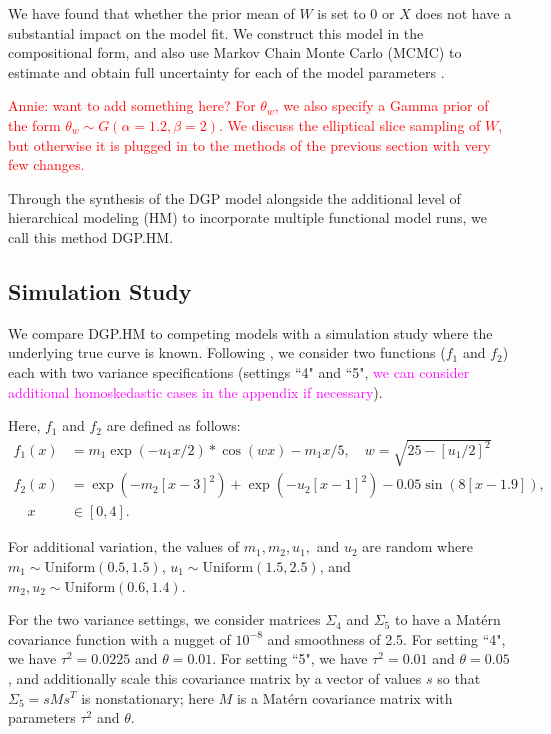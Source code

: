 \documentclass[11pt]{article}
\begin{document}
We have found that whether the prior mean of $W$ is set to 0 or $X$ 
\citep[which would indicate stationarity apriori,][]{schmidt2003bayesian} does not 
have a substantial impact on the model fit. We construct this model in the 
compositional form, and also use Markov Chain Monte Carlo (MCMC) to estimate and 
obtain full uncertainty for each of the model parameters \citep{sauer2023active}.

\textcolor{red}{Annie: want to add something here? For $\theta_w$, we also specify 
a Gamma prior of the form $\theta_w \sim G(\alpha=1.2, \beta=2)$. We discuss the 
elliptical slice sampling of $W$, but otherwise it is plugged in to the methods 
of the previous section with very few changes.}

Through the synthesis of the DGP model alongside the additional level of hierarchical 
modeling (HM) to incorporate multiple functional model runs, we call this method DGP.HM.

\subsection{Simulation Study}
\label{subsec:sim}

We compare DGP.HM to competing models with a simulation study where the underlying 
true curve is known. Following \cite{moran2024dpc}, we consider two functions 
($f_1$ and $f_2$) each with two variance specifications (settings ``4" and ``5", 
\textcolor{magenta}{we can consider additional homoskedastic cases in the appendix if necessary}). 

Here, $f_1$ and $f_2$ are defined as follows:
\begin{align}
  f_1(x) &= m_1 \exp(-u_1x/2) * \cos(wx) - m_1x/5, \quad w=\sqrt{25-[u_1/2]^2} \\
  f_2(x) &= \exp(-m_2[x-3]^2)+\exp(-u_2[x-1]^2)-0.05\sin(8[x-1.9]), \\ 
  \quad x &\in [0,4].
\end{align}

For additional variation, the values of $m_1, m_2, u_1,$ and $u_2$ are random where 
$m_1 \sim \text{Uniform}(0.5,1.5)$, $u_1 \sim \text{Uniform}(1.5,2.5)$, and $m_2,u_2 
\sim \text{Uniform}(0.6,1.4)$. 
      
For the two variance settings, we consider matrices $\Sigma_4$ and $\Sigma_5$ to 
have a Mat\'ern covariance function with a nugget of $10^{-8}$ and smoothness of 2.5. 
For setting ``4", we have $\tau^2=0.0225$ and $\theta=0.01$. For setting ``5", we have 
$\tau^2=0.01$ and $\theta=0.05$, and additionally scale this covariance matrix by 
a vector of values $s$ so that $\Sigma_5 = s M s^T$ is nonstationary; here $M$ is 
a Mat\'ern covariance matrix with parameters $\tau^2$ and $\theta$.
\end{document}
